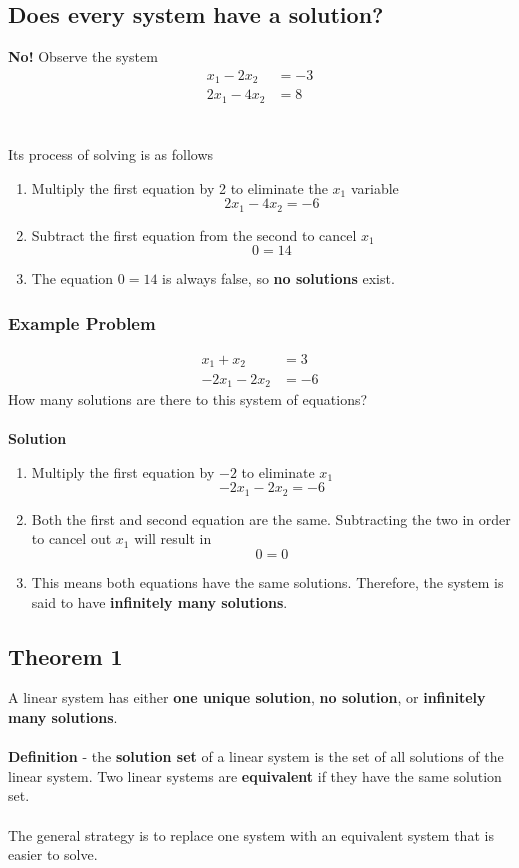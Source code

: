 \subsection{Does every system have a solution?}
\textbf{No!} Observe the system
\[
\begin{aligned}
  x_1 - 2x_2 &= -3 \\
  2x_1 - 4x_2 &= 8
\end{aligned}
\] \\\\
Its process of solving is as follows
\begin{enumerate}
  \item Multiply the first equation by 2 to eliminate the $x_1$ variable
    \[
      2x_1 - 4x_2 = -6
    \]
  \item Subtract the first equation from the second to cancel $x_1$
    \[
      0 = 14
    \]
  \item The equation $0 = 14$ is always false, so \textbf{no solutions} exist.
\end{enumerate}
\subsubsection{Example Problem}
\[
  \begin{aligned}
    x_1 + x_2 &= 3 \\
    -2x_1 - 2x_2 &= -6
  \end{aligned}
\]
How many solutions are there to this system of equations? \\\\
\textbf{Solution}
\begin{enumerate}
  \item Multiply the first equation by $-2$ to eliminate $x_1$
    \[
      -2x_1 - 2x_2 = -6
    \]
  \item Both the first and second equation are the same. Subtracting the two in order to cancel out $x_1$ will result in
    \[
      0 = 0
    \]
  \item This means both equations have the same solutions. Therefore, the system is said to have \textbf{infinitely many solutions}.
\end{enumerate}
\subsection{Theorem 1}
A linear system has either \textbf{one unique solution}, \textbf{no solution}, or \textbf{infinitely many solutions}. \\\\
\textbf{Definition} - the \textbf{solution set} of a linear system is the set of all solutions of the linear system. Two linear systems are \textbf{equivalent} if they have the same solution set. \\\\
The general strategy is to replace one system with an equivalent system that is easier to solve.
